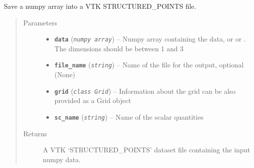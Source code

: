 \documentclass[letterpaper,10pt,english]{sphinxmanual}
\begin{document}
\begin{fulllineitems}
\label{hyvr:hyvr.hyvr.utils.to_vtk}
Save a numpy array into a VTK STRUCTURED\_POINTS file.
\begin{quote}\begin{description}
\item[{Parameters}] \leavevmode\begin{itemize}
\item {} 
\textbf{\texttt{data}} (\emph{\texttt{numpy array}}) -- Numpy array containing the data,  or  or .
The dimensions should be between 1 and 3

\item {} 
\textbf{\texttt{file\_name}} (\emph{\texttt{string}}) -- Name of the file for the output, optional (None)

\item {} 
\textbf{\texttt{grid}} (\emph{\texttt{class Grid}}) -- Information about the grid can be also provided as a Grid object

\item {} 
\textbf{\texttt{sc\_name}} (\emph{\texttt{string}}) -- Name of the scalar quantities

\end{itemize}

\item[{Returns}] \leavevmode

A VTK `STRUCTURED\_POINTS' dataset file containing the input numpy data.


\end{description}\end{quote}

\end{fulllineitems}

\end{document}

